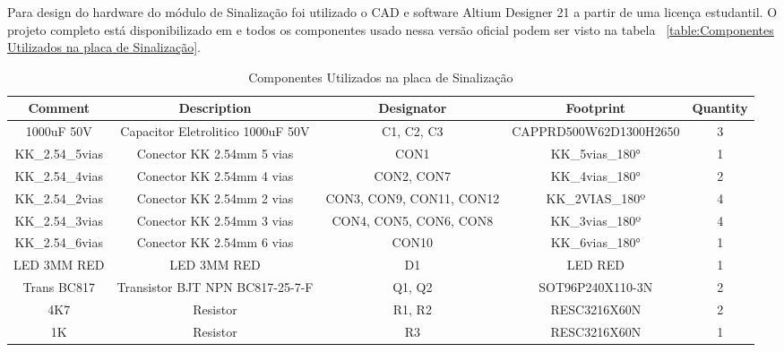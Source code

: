 \documentclass[../poliXuniversity_hospital_-USP-report.tex]{subfiles}
\begin{document}
Para design do hardware do módulo de Sinalização foi utilizado o CAD e software Altium Designer 21 \cite{altium21} a partir de uma licença estudantil. O projeto completo está disponibilizado em \cite{github_modulos} e todos os componentes usado nessa versão oficial podem ser visto na tabela ~\ref{table:Componentes Utilizados na placa de Sinalização}.

\begin{table}[!ht]
\caption{Componentes Utilizados na placa de Sinalização}
\centering
\begin{adjustbox}{width=\columnwidth,center}
\begin{tabular}{|c|c|c|c|c|}
\hline
Comment                   & Description                                  & Designator                & Footprint                 & Quantity \\ \hline
1000uF 50V                & Capacitor Eletrolitico 1000uF 50V            & C1, C2, C3                & CAPPRD500W62D1300H2650    & 3        \\ \hline
KK\_2.54\_5vias           & Conector KK 2.54mm 5 vias                    & CON1                      & KK\_5vias\_180°           & 1        \\ \hline
KK\_2.54\_4vias           & Conector KK 2.54mm 4 vias                    & CON2, CON7                & KK\_4vias\_180°           & 2        \\ \hline
KK\_2.54\_2vias           & Conector KK 2.54mm 2 vias                    & CON3, CON9, CON11, CON12  & KK\_2VIAS\_180º           & 4        \\ \hline
KK\_2.54\_3vias           & Conector KK 2.54mm 3 vias                    & CON4, CON5, CON6, CON8    & KK\_3vias\_180º           & 4        \\ \hline
KK\_2.54\_6vias           & Conector KK 2.54mm 6 vias                    & CON10                     & KK\_6vias\_180°           & 1        \\ \hline
LED 3MM RED               & LED 3MM RED                                  & D1                        & LED RED                   & 1        \\ \hline
Trans BC817               & Transistor BJT NPN BC817-25-7-F              & Q1, Q2                    & SOT96P240X110-3N          & 2        \\ \hline
4K7                       & Resistor                                     & R1, R2                    & RESC3216X60N              & 2        \\ \hline
1K                        & Resistor                                     & R3                        & RESC3216X60N              & 1        \\ \hline

\end{tabular}
\end{adjustbox}
\end{table}
\end{document}

